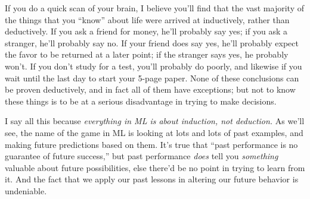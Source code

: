 If you do a quick scan of your brain, I believe you'll find that the vast
majority of the things that you ``know'' about life were arrived at
inductively, rather than deductively. If you ask a friend for money, he'll
probably say yes; if you ask a stranger, he'll probably say no. If your friend
does say yes, he'll probably expect the favor to be returned at a later point;
if the stranger says yes, he probably won't. If you don't study for a test,
you'll probably do poorly, and likewise if you wait until the last day to start
your 5-page paper. None of these conclusions can be proven deductively, and in
fact all of them have exceptions; but not to know these things is to be at a
serious disadvantage in trying to make decisions.

I say all this because \textit{everything in ML is about induction, not
deduction.} As we'll see, the name of the game in ML is looking at lots and
lots of past examples, and making future predictions based on them. It's true
that ``past performance is no guarantee of future success,'' but past
performance \textit{does} tell you \textit{something} valuable about future
possibilities, else there'd be no point in trying to learn from it. And the
fact that we apply our past lessons in altering our future behavior is
undeniable.
